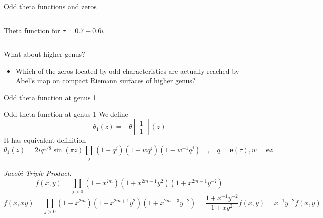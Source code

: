 \documentclass[11pt,aspectratio=169]{beamer}
\newcommand{\ee}[0]{\mathbf{e}}
\begin{document}
\begin{frame}{Odd theta functions and zeros}
\begin{columns}[onlytextwidth]
\begin{column}{0.45\textwidth}
            \tiny Theta function for $\tau = 0.7+0.6i$
            
            \cite{Cha22}
        \end{column}
    \end{columns}

    {
        \begin{block}{What about higher genus?}
            \begin{itemize}
                \item Which of the zeros located by odd characteristics are actually reached by Abel's map on compact Riemann surfaces of higher genus?
            \end{itemize}
        \end{block}
    }
\end{frame}

\begin{frame}{Odd theta function at genus 1}
    \begin{block}{Odd theta function at genus 1}
        We define
        \[\theta_1(z) = -\theta \begin{bmatrix} 1 \\ 1 \end{bmatrix}(z)\]
        It has equivalent definition
        \[\theta_1(z) = 2iq^{1/8} \sin(\pi z) \prod_j (1-q^j) (1-wq^j)(1-w^{-1}q^j) \quad , \quad q=\ee(\tau),w=\ee{z}\]
    \end{block}
    \emph{Jacobi Triple Product:}
    \[f(x,y) = \prod_{j>0} (1-x^{2m})(1+x^{2m-1}y^2)(1+x^{2m-1}y^{-2})\]
    \[f(x,xy) = \prod_{j>0} (1-x^{2m})(1+x^{2m+1}y^2)(1+x^{2m-3}y^{-2}) = \frac{1+x^{-1}y^{-2}}{1+xy^2} f(x,y) = x^{-1}y^{-2}f(x,y)\]
\end{frame}
\end{document}
